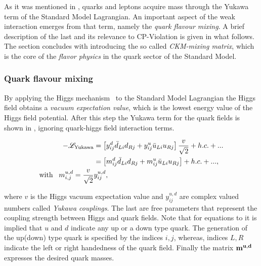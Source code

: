 As it was mentioned in , quarks and leptons acquire mass through the Yukawa term
of the Standard Model Lagrangian. An important aspect of the weak interaction emerges from that term,
namely the {\it quark flavour mixing}. A brief description of the last and its relevance to CP-Violation is given in what follows.
The section concludes with introducing the so called {\it CKM-mixing matrix}, which is the core of the
{\it flavor physics} in the quark sector of the Standard Model.

\subsubsection{Quark flavour mixing}
By applying the Higgs mechanism~\cite{PhysRevLett.13.321,PhysRevLett.13.508} to the Standard Model Lagrangian the Higgs field obtains a
{\it vacuum expectation value}, which is the lowest energy value of the Higgs field potential.
After this step the Yukawa term for the quark fields is shown in ,
 ignoring quark-higgs field interaction terms.

\begin{subequations}
\label{yukawa_flavour}
\centering
  \begin{align}
  -\mathscr{L}_{\text{Yukawa}} &= \left[ y_{ij}^d \bar{d}_{Li} d_{Rj} + y_{ij}^u \bar{u}_{Li} u_{Rj} \right] \frac{v}{\sqrt{2}} + h.c. + ...  \\
                               &= \left[ m_{ij}^d \bar{d}_{Li} d_{Rj} + m_{ij}^u \bar{u}_{Li} u_{Rj} \right] + h.c. + ...,  \\
                               \text{with} \;\;\; m^{u,d}_{i,j} = \frac{v}{\sqrt{2}} & y_{ij}^{u,d}, \nonumber
  \end{align}
\end{subequations}

\noindent where $v$ is the Higgs vacuum expectation value and $y_{ij}^{u,d}$ are complex valued numbers called {\it Yukawa couplings}.
The last are free parameters that represent the coupling strength between Higgs and quark fields.
Note that for equations  to  it is implied that $u$ and $d$ indicate
any up or a down type quark. The generation of the up(down) type quark is specified by the indices $i,j$,
whereas, indices $L,R$ indicate the left or right handedness of the quark field.
Finally the matrix $\bf m^{u,d}$ expresses the desired quark masses.

